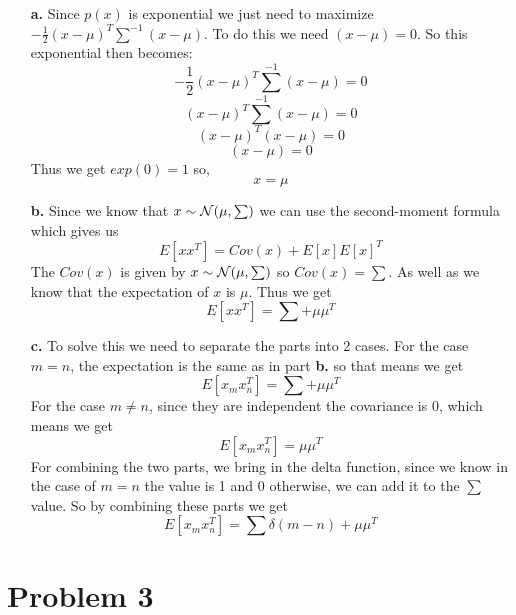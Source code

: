 \documentclass[12pt]{article}
\begin{document}
\begin{enumerate}
    \item[\textbf{a.}] Since $p(x)$ is exponential we just need to maximize $-\frac{1}{2}(x - \mu)^{T}\sum^{-1}(x - \mu)$. 
    To do this we need $(x - \mu) = 0$.
    So this exponential then becomes:
    \[
    -\frac{1}{2}(x - \mu)^{T}\sum^{-1}(x - \mu) = 0
    \]
    \[
    (x - \mu)^{T}\sum^{-1}(x - \mu) = 0
    \]
    \[
    (x - \mu)^{T}(x - \mu) = 0
    \]
    \[
    (x - \mu) = 0
    \]
    Thus we get $exp(0) = 1$ so, 
    \[
    x = \mu
    \]
    \item[\textbf{b.}] Since we know that $x \sim \cal{N}(\mu, \sum)$ we can use the second-moment formula which gives us
    \[
    E[xx^{T}] = Cov(x) + E[x]E[x]^{T}
    \]
    The $Cov(x)$ is given by $x \sim \cal{N}(\mu, \sum)$ so $Cov(x) = \sum$. 
    As well as we know that the expectation of $x$ is $\mu$.
    Thus we get
    \[
    E[xx^{T}] = \sum + \mu\mu^{T}
    \]
	\item[\textbf{c.}] To solve this we need to separate the parts into 2 cases.
	For the case $m = n$, the expectation is the same as in part \textbf{b.} so that means we get
	\[
	E[x_{m}x_{n}^{T}] = \sum + \mu\mu^{T}
	\]
	For the case $m \neq n$, since they are independent the covariance is 0, which means we get
	\[
	E[x_{m}x_{n}^{T}] = \mu\mu^{T}
	\]
	For combining the two parts, we bring in the delta function, since we know in the case of $m = n$ the value is 1 and 0 otherwise, we can add it to the $\sum$ value.
	So by combining these parts we get
	\[
	\boxed{E[x_{m}x_{n}^{T}] = \sum\delta(m - n) + \mu\mu^{T}}
	\]
	
\end{enumerate}

\section*{Problem 3}
\end{document}
